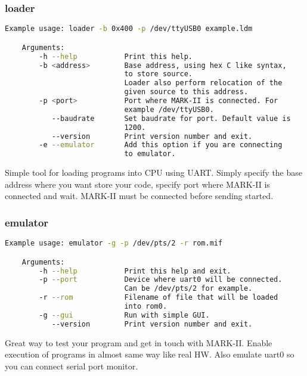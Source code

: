 \subsubsection{loader}

\begin{lstlisting}[language=bash, frame=single]
    Example usage: loader -b 0x400 -p /dev/ttyUSB0 example.ldm

    Arguments:
        -h --help           Print this help.
        -b <address>        Base address, using hex C like syntax,
                            to store source.
                            Loader also perform relocation of the
                            given source to this address.
        -p <port>           Port where MARK-II is connected. For
                            example /dev/ttyUSB0.
           --baudrate       Set baudrate for port. Default value is
                            1200.
           --version        Print version number and exit.
        -e --emulator       Add this option if you are connecting
                            to emulator.
\end{lstlisting}

Simple tool for loading programs into CPU using UART. Simply specify the base
address where you want store your code, specify port where MARK-II is connected
and wait. MARK-II must be connected before sending started.

\subsubsection{emulator}

\begin{lstlisting}[language=bash, frame=single]
    Example usage: emulator -g -p /dev/pts/2 -r rom.mif

    Arguments:
        -h --help           Print this help and exit.
        -p --port           Device where uart0 will be connected.
                            Can be /dev/pts/2 for example.
        -r --rom            Filename of file that will be loaded
                            into rom0.
        -g --gui            Run with simple GUI.
           --version        Print version number and exit.
\end{lstlisting}

Great way to test your program and get in touch with MARK-II. Enable execution
of programs in almost same way like real HW. Also emulate uart0 so you can
connect serial port monitor.

